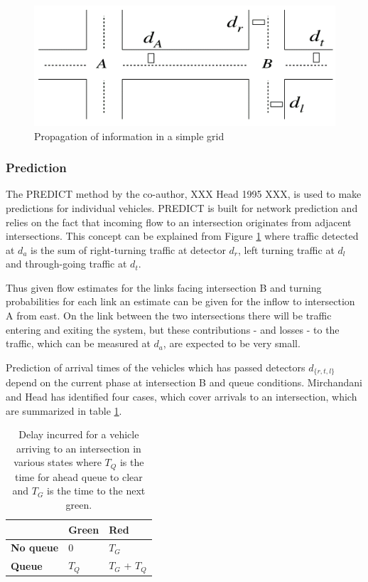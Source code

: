 \begin{figure}[!ht]
\begin{center}
\includegraphics[scale=0.5]{rhodes_prediction-strategy.png} 
\end{center}
\caption{Propagation of information in a simple grid}
\label{fig:rhodes_predict}
\end{figure}

\subsubsection*{Prediction}
The PREDICT method by the co-author, XXX Head 1995 XXX, is used to make
predictions for individual vehicles. PREDICT is built for network
prediction and relies on the fact that incoming flow to an
intersection originates from adjacent intersections. This concept can
be explained from Figure \ref{fig:rhodes_predict} where traffic
detected at $d_a$ is the sum of right-turning traffic at detector
$d_r$, left turning traffic at $d_l$ and through-going traffic at
$d_t$.

Thus given flow estimates for the links facing intersection B and
turning probabilities for each link an estimate can be given for the
inflow to intersection A from east. On the link between the two
intersections there will be traffic entering and exiting the system,
but these contributions - and losses - to the traffic, which can be
measured at $d_a$, are expected to be very small.

Prediction of arrival times of the vehicles which has passed detectors
$d_{\lbrace r,t,l \rbrace}$ depend on the current phase at
intersection B and queue conditions. Mirchandani and Head has
identified four cases, which cover arrivals to an intersection, which
are summarized in table \ref{tbl:delaycases}.

\begin{table}[!ht]
\begin{center}
\begin{tabular}{l|ll}
 & \textbf{Green} & \textbf{Red} \\ \hline
\textbf{No queue} & 0 & $T_G$ \\
\textbf{Queue} & $T_Q$ & $T_G$ + $T_Q$
\end{tabular}
\end{center}
\caption{Delay incurred for a vehicle arriving to an intersection in various states where $T_Q$ is the time for ahead queue to clear and $T_G$ is the time to the next green.}
\label{tbl:delaycases}
\end{table}

